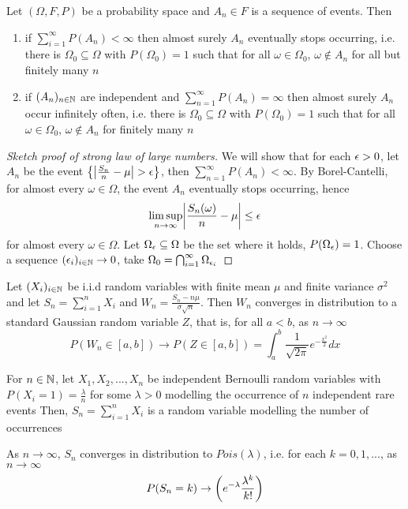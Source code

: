 \documentclass{report}
\begin{document}
\begin{lemma}
    Let $(\Omega, F, P)$ be a probability space and $A_n \in F$ is a sequence of events. Then
    \begin{enumerate}
        \item if $\sum_{i=1}^\infty P(A_n) < \infty$ then almost surely $A_n$ eventually stops occurring, i.e. there is $\Omega_0 \subseteq \Omega$ with $P(\Omega_0) = 1$ such that for all $\omega \in \Omega_0$, $\omega \notin A_n$ for all but finitely many $n$ 

        \item if $(A_n)_{n \in \N}$ are independent and $\sum_{n=1}^\infty P(A_n) = \infty$ then almost surely $A_n$ occur infinitely often, i.e. there is $\Omega_0 \subseteq \Omega$ with $P(\Omega_0) = 1$ such that for all $\omega \in \Omega_0$, $\omega \notin A_n$ for finitely many $n$
    \end{enumerate}
\end{lemma}

\begin{proof}[Sketch proof of strong law of large numbers]
    We will show that for each $\eps > 0$, let $A_n$ be the event $\set*{\abs*{\frac{S_n}{n} - \mu} > \eps}$, then $\sum_{n=1}^\infty P(A_n) < \infty$. By Borel-Cantelli, for almost every $\omega \in \Omega$, the event $A_n$ eventually stops occurring, hence
    $$
        \limsup_{n \to \infty} \abs*{\frac{S_n(\omega)}{n} - \mu} \leq \eps
    $$
    for almost every $\omega \in \Omega$. Let $\Omega_\eps \subseteq \Omega$ be the set where it holds, $P(\Omega_\eps) = 1$. Choose a sequence $(\eps_i)_{i \in \N} \to 0$, take $\Omega_0 = \bigcap_{i=1}^\infty \Omega_{\eps_i}$
\end{proof}


\begin{theorem}
    Let $(X_i)_{i \in \N}$ be i.i.d random variables with finite mean $\mu$ and finite variance $\sigma^2$ and let $S_n = \sum_{i=1}^n X_i$ and $W_n = \frac{S_n - n \mu}{\sigma \sqrt{n}}$. Then $W_n$ converges in distribution to a standard Gaussian random variable $Z$, that is, for all $a < b$, as $n \to \infty$
    $$
        P(W_n \in [a, b]) \to P(Z \in [a, b]) = \int_a^b \frac{1}{\sqrt{2\pi}} e^{-\frac{x^2}{2}} dx
    $$
\end{theorem}

\begin{theorem}
    For $n \in \N$, let $X_1, X_2, ..., X_n$ be independent Bernoulli random variables with $P(X_i = 1) = \frac{\lambda}{n}$ for some $\lambda > 0$ modelling the occurrence of $n$ independent rare events
    Then, $S_n = \sum_{i=1}^n X_i$ is a random variable modelling the number of occurrences

    As $n \to \infty$, $S_n$ converges in distribution to $Pois(\lambda)$, i.e. for each $k = 0, 1, ...$, as $n \to \infty$ 
    $$
        P(S_n = k) \to \tuple*{e^{-\lambda} \frac{\lambda^k}{k!}}
    $$
\end{theorem}
\end{document}
